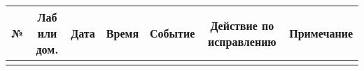 \begin{center}
    \begin{tabular}{ | c | c | c | c | c | c | c | }
        \hline
        № & Лаб или дом. & Дата & Время & Событие & Действие по исправлению & Примечание \\ \hline
        \hspace{0cm} & \hspace{0cm} & \hspace{0cm}& \hspace{0cm}& \hspace{0cm}& \hspace{0cm}& \hspace{0cm} \\
        \hline
    \end{tabular}
\end{center}
